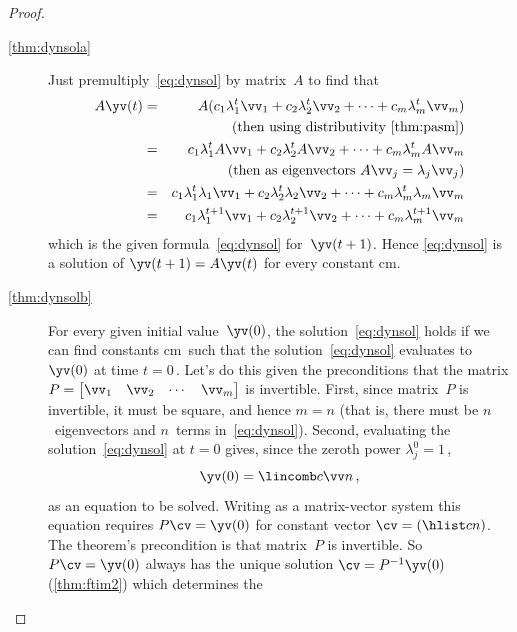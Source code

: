 \begin{proof} \ 
\begin{description}
\item[\ref{thm:dynsola}] 
Just premultiply~\eqref{eq:dynsol} by matrix~\(A\) to find that
\begin{eqnarray*}
A\yv(t)&=&A(c_1\lambda_1^t\vv_1+c_2\lambda_2^t\vv_2+\cdots+c_m\lambda_m^t\vv_m)
\\&&\quad(\text{then using distributivity \cref{thm:pasm}})
\\&=&c_1\lambda_1^tA\vv_1+c_2\lambda_2^tA\vv_2+\cdots+c_m\lambda_m^tA\vv_m
\\&&\quad(\text{then as eigenvectors }A\vv_j=\lambda_j\vv_j)
\\&=&c_1\lambda_1^t\lambda_1\vv_1+c_2\lambda_2^t\lambda_2\vv_2+\cdots+c_m\lambda_m^t\lambda_m\vv_m
\\&=&c_1\lambda_1^{t+1}\vv_1+c_2\lambda_2^{t+1}\vv_2+\cdots+c_m\lambda_m^{t+1}\vv_m
\end{eqnarray*}
which is the given formula~\eqref{eq:dynsol} for~\(\yv(t+1)\).
Hence \eqref{eq:dynsol} is a solution of \(\yv(t+1)=A\yv(t)\) for every constant \hlist cm.

\item[\ref{thm:dynsolb}]
For every given initial value~\(\yv(0)\), the solution~\eqref{eq:dynsol} holds if we can find constants \hlist cm\ such that the solution~\eqref{eq:dynsol} evaluates to~\(\yv(0)\) at time \(t=0\)\,.
Let's do this given the preconditions that 
the matrix \(P=\begin{bmatrix} \vv_1&\vv_2&\cdots&\vv_m \end{bmatrix}\) is {invertible}.
First, since matrix~\(P\) is invertible, it must be square, and hence \(m=n\) (that is, there must be \(n\)~eigenvectors and \(n\)~terms in~\eqref{eq:dynsol}).
Second, evaluating the solution~\eqref{eq:dynsol} at \(t=0\) gives, since the zeroth power \(\lambda_j^0=1\)\,,
\begin{equation*}
\yv(0)=\lincomb c\vv n\,,
\end{equation*}
as an equation to be solved.
Writing as a matrix-vector system this equation requires \(P\cv=\yv(0)\) for constant vector \(\cv=(\hlist cn)\).
The theorem's precondition is that matrix~\(P\) is invertible.
So \(P\cv=\yv(0)\) always has the unique solution \(\cv=P^{-1}\yv(0)\) (\cref{thm:ftim2}) which determines the 
\end{description}
\end{proof}




